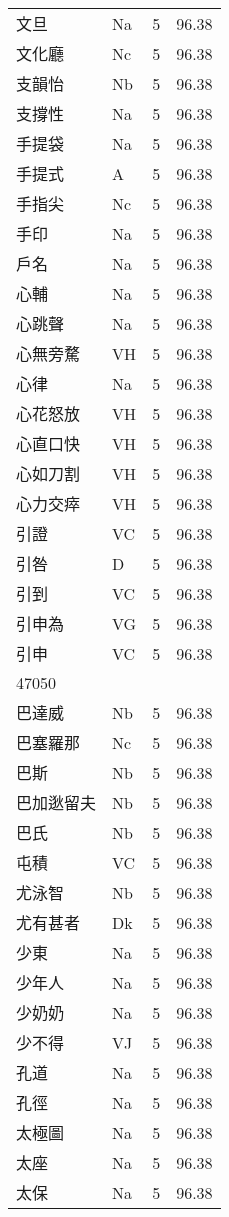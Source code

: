 \documentclass[twocolumn]{book}
\begin{document}
\begin{supertabular}{llrr}
文旦 & Na & 5 &  96.38\\
文化廳 & Nc & 5 &  96.38\\
支韻怡 & Nb & 5 &  96.38\\
支撐性 & Na & 5 &  96.38\\
手提袋 & Na & 5 &  96.38\\
手提式 & A & 5 &  96.38\\
手指尖 & Nc & 5 &  96.38\\
手印 & Na & 5 &  96.38\\
戶名 & Na & 5 &  96.38\\
心輔 & Na & 5 &  96.38\\
心跳聲 & Na & 5 &  96.38\\
心無旁騖 & VH & 5 &  96.38\\
心律 & Na & 5 &  96.38\\
心花怒放 & VH & 5 &  96.38\\
心直口快 & VH & 5 &  96.38\\
心如刀割 & VH & 5 &  96.38\\
心力交瘁 & VH & 5 &  96.38\\
引證 & VC & 5 &  96.38\\
引咎 & D & 5 &  96.38\\
引到 & VC & 5 &  96.38\\
引申為 & VG & 5 &  96.38\\
引申 & VC & 5 &  96.38\\
47050\\
巴達威 & Nb & 5 &  96.38\\
巴塞羅那 & Nc & 5 &  96.38\\
巴斯 & Nb & 5 &  96.38\\
巴加逖留夫 & Nb & 5 &  96.38\\
巴氏 & Nb & 5 &  96.38\\
屯積 & VC & 5 &  96.38\\
尤泳智 & Nb & 5 &  96.38\\
尤有甚者 & Dk & 5 &  96.38\\
少東 & Na & 5 &  96.38\\
少年人 & Na & 5 &  96.38\\
少奶奶 & Na & 5 &  96.38\\
少不得 & VJ & 5 &  96.38\\
孔道 & Na & 5 &  96.38\\
孔徑 & Na & 5 &  96.38\\
太極圖 & Na & 5 &  96.38\\
太座 & Na & 5 &  96.38\\
太保 & Na & 5 &  96.38\\

\end{supertabular}
\end{document}
